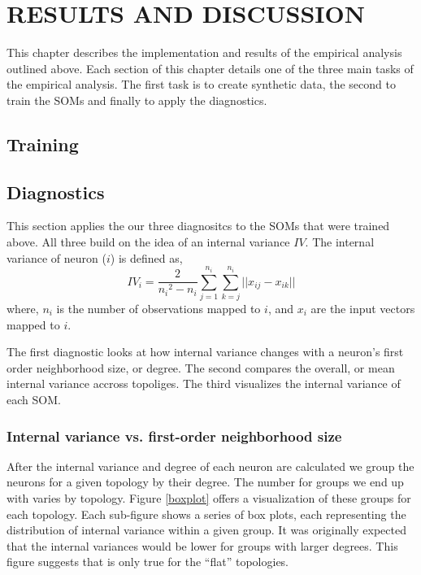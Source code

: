 \chapter{RESULTS AND DISCUSSION}
This chapter describes the implementation and results of the empirical analysis
outlined above.  Each section of this chapter details one of the three main
tasks of the empirical analysis.  The first task is to create synthetic data,
the second to train the SOMs and finally to apply the diagnostics.


\section{Training}


\section{Diagnostics}
This section applies the our three diagnositcs to the SOMs that were trained
above.  All three build on the idea of an internal variance \(IV\). The
internal variance of neuron (\(i\)) is defined as,
 \begin{equation}
   {IV_i} = \frac{2}{{n_i}^2-{n_i}}\sum_{j=1}^{n_i}\sum_{k=j}^{n_i} ||{x_{ij}}-{x_{ik}}||
 \label{eqno1}
 \end{equation}
where, \(n_i\) is the number of observations mapped to \(i\), and \(x_i\) are
the input vectors mapped to \(i\).

The first diagnostic looks at how internal variance changes with a neuron's first
order neighborhood size, or degree.  The second compares the overall, or mean
internal variance accross topoliges.  The third visualizes the internal
variance of each SOM.

\subsection{Internal variance vs. first-order neighborhood size}
After the internal variance and degree of each neuron are calculated we
group the neurons for a given topology by their degree. The number for groups
we end up with varies by topology. Figure \ref{boxplot} offers a visualization
of these groups for each topology.  Each sub-figure shows a series of box
plots, each representing the distribution of internal variance within a given
group.  It was originally expected that the internal variances would be lower
for groups with larger degrees. This figure suggests that is only true for the
``flat'' topologies.

